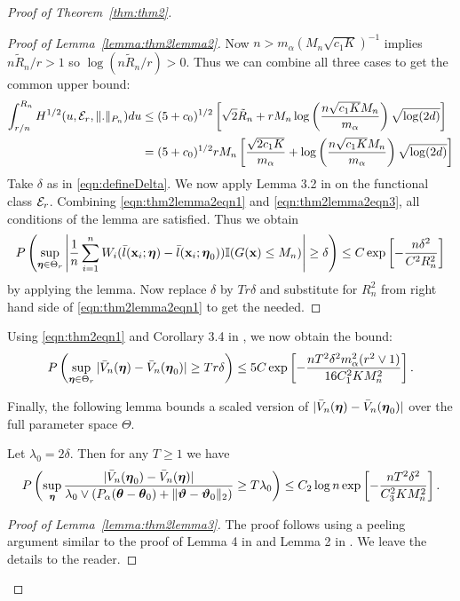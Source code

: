 \documentclass[11pt,letterpaper]{article}
\numberwithin{equation}{section}
\begin{document}
\begin{proof}[Proof of Theorem~\ref{thm:thm2}]
\begin{proof}[Proof of Lemma~\ref{lemma:thm2lemma2}]
Now $n > m_\alpha (M_n \sqrt{c_1 K})^{-1}$ implies $n \tilde R_n/r > 1$ so $\log(n \tilde R_n/r)>0$. Thus we can combine all three cases to get the common upper bound:
%
\begin{align}
\int_{r/n}^{R_n} H^{1/2} (u, {\cal{E}}_r, \|.\|_{P_n}) du & \leq
( 5 + c_0 )^{1/2} \left[ \sqrt 2 \tilde R_n + r M_n 
\log \left( \frac{n \sqrt{c_1 K} M_n}{m_\alpha} \right) \sqrt{ \log (2d)} \right] \notag\\
&= ( 5 + c_0 )^{1/2} r M_n \left[ \frac{ \sqrt{2 c_1 K}}{m_\alpha} + 
\log \left( \frac{n \sqrt{c_1 K} M_n}{m_\alpha} \right) \sqrt{ \log (2d)} \right]
\label{eqn:thm2lemma2eqn3}
\end{align}
%
Take $\delta$ as in \eqref{eqn:defineDelta}. We now apply Lemma 3.2 in \cite{vandeGeerBook00} on the functional class ${\cal{E}}_r$. Combining \eqref{eqn:thm2lemma2eqn1} and \eqref{eqn:thm2lemma2eqn3}, all conditions of the lemma are satisfied. Thus we obtain
%
$$
P \left( \sup_{{\boldsymbol{\eta}} \in \Theta_r} \left| \frac{1}{n} \sum_{i=1}^n W_i (\bar l({\bf{x}}_i; {\boldsymbol{\eta}}) -  \bar l( {\bf{x}}_i; {\boldsymbol{\eta}}_0)) {\mathbb{I}}(G({\bf{x}}) \leq M_n ) \right| \geq \delta \right) \leq
C \exp \left[ - \frac{n \delta^2}{ C^2 R_n^2} \right]
$$
%
by applying the lemma. Now replace $\delta$ by $Tr \delta$ and substitute for $R_n^2$ from right hand side of \eqref{eqn:thm2lemma2eqn1} to get the needed.
\end{proof}

Using \eqref{eqn:thm2eqn1} and Corollary 3.4 in \cite{vandeGeerBook00}, we now obtain the bound:
%
\begin{align}\label{eqn:thm2eqn3}
P \left( \sup_{{\boldsymbol{\eta}} \in \Theta_r} | \bar V_n({\boldsymbol{\eta}}) - \bar V_n({\boldsymbol{\eta}}_0) |
\geq T r \delta \right) \leq
5 C \exp \left[ - \frac{n T^2 \delta^2 m_\alpha^2 ( r^2 \vee 1)}{ 16 C_1^2 K M_n^2} \right].
\end{align}

Finally, the following lemma bounds a scaled version of $| \bar V_n({\boldsymbol{\eta}}) - \bar V_n({\boldsymbol{\eta}}_0) |$ over the full parameter space $\Theta$.

\begin{Lemma}\label{lemma:thm2lemma3}
Let $\lambda_0 = 2 \delta$. Then for any $T \geq 1$ we have
%
$$
P \left( \sup_{\boldsymbol{\eta}} \frac{ |\bar V_n({\boldsymbol{\eta}}_0) - \bar V_n({\boldsymbol{\eta}})| }{\lambda_0 \vee
(P_\alpha({\boldsymbol{\theta}} - {\boldsymbol{\theta}}_0) + \| {\boldsymbol{\vartheta}} - {\boldsymbol{\vartheta}}_0 \|_2) } \geq T \lambda_0 \right) \leq
C_2 \log n \exp \left[ - \frac{n T^2 \delta^2 }{ C_3^2 K M_n^2} \right].
$$
\end{Lemma}

\begin{proof}[Proof of Lemma~\ref{lemma:thm2lemma3}]
The proof follows using a peeling argument similar to the proof of Lemma 4 in \cite{FengSimon17} and Lemma 2 in \cite{StadlerEtal10}. We leave the details to the reader.
\end{proof}


\end{proof}
\end{document}
